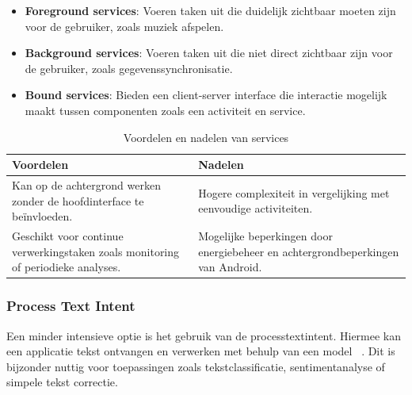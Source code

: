\begin{itemize}
    \item \textbf{Foreground \gls{services}}: Voeren taken uit die duidelijk zichtbaar moeten zijn voor de gebruiker, zoals muziek afspelen.
    \item \textbf{Background \gls{services}}: Voeren taken uit die niet direct zichtbaar zijn voor de gebruiker, zoals gegevenssynchronisatie.
    \item \textbf{Bound \gls{services}}: Bieden een client-server interface die interactie mogelijk \\maakt tussen componenten zoals een activiteit en service.
\end{itemize}

\begin{table} [H]
    \centering
    \begin{tabular}{p{} p{}}
        \toprule
        \textbf{Voordelen} & \textbf{Nadelen} \\
        \midrule
        Kan op de achtergrond werken zonder de hoofdinterface te beïnvloeden. & Hogere complexiteit in vergelijking met eenvoudige activiteiten. \\
        Geschikt voor continue verwerkingstaken zoals monitoring of periodieke analyses. & Mogelijke beperkingen door energiebeheer en achtergrondbeperkingen van Android. \\
        \bottomrule
    \end{tabular}
    \caption[Voordelen en nadelen van \gls{services}]{\label{tab:services_pros_cons}Voordelen en nadelen van \gls{services}}
\end{table}

\subsubsection{Process Text Intent}

Een minder intensieve optie is het gebruik van de \gls{processtextintent}. Hiermee kan een applicatie tekst ontvangen en verwerken met behulp van een  model ~\autocite{Android2024Intent}. Dit is bijzonder nuttig voor toepassingen zoals tekstclassificatie, sentimentanalyse of simpele tekst correctie.

